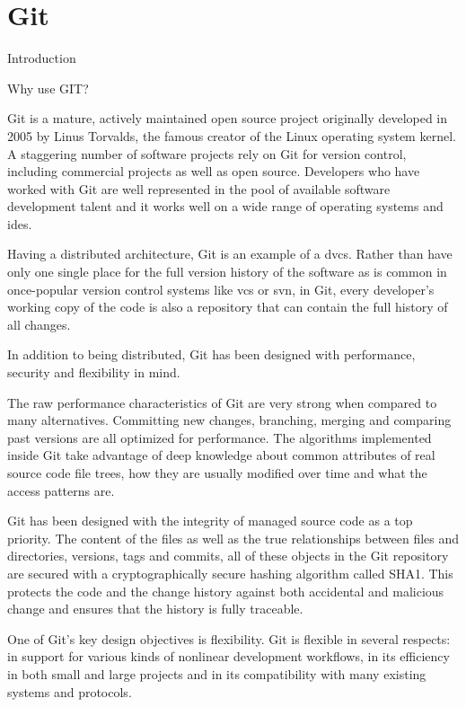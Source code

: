\section{Git}
\label{sec:git}

Introduction

Why use GIT?


Git is a mature, actively maintained open source project originally developed in 2005 by Linus Torvalds, the famous creator of the Linux operating system kernel. A staggering number of software projects rely on Git for version control, including commercial projects as well as open source. Developers who have worked with Git are well represented in the pool of available software development talent and it works well on a wide range of operating systems and \glspl{ide}.

Having a distributed architecture, Git is an example of a \gls{dvcs}. Rather than have only one single place for the full version history of the software as is common in once-popular version control systems like \gls{vcs} or \gls{svn}, in Git, every developer's working copy of the code is also a repository that can contain the full history of all changes.

In addition to being distributed, Git has been designed with performance, security and flexibility in mind.

The raw performance characteristics of Git are very strong when compared to many alternatives. Committing new changes, branching, merging and comparing past versions are all optimized for performance. The algorithms implemented inside Git take advantage of deep knowledge about common attributes of real source code file trees, how they are usually modified over time and what the access patterns are.

Git has been designed with the integrity of managed source code as a top priority. The content of the files as well as the true relationships between files and directories, versions, tags and commits, all of these objects in the Git repository are secured with a cryptographically secure hashing algorithm called SHA1. This protects the code and the change history against both accidental and malicious change and ensures that the history is fully traceable.

One of Git's key design objectives is flexibility. Git is flexible in several respects: in support for various kinds of nonlinear development workflows, in its efficiency in both small and large projects and in its compatibility with many existing systems and protocols.